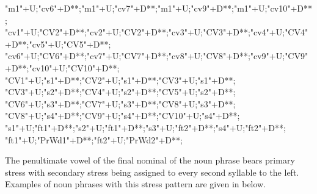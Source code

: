 \begin{multicols}{2}
\begin{exe}
{				"m1"+U;"cv6"+D**\dir{-};"m1"+U;"cv7"+D**\dir{-};"m1"+U;"cv9"+D**\dir{-};"m1"+U;"cv10"+D**\dir{-};
				"cv1"+U;"CV2"+D**\dir{-};"cv2"+U;"CV2"+D**\dir{-};"cv3"+U;"CV3"+D**\dir{-};"cv4"+U;"CV4"+D**\dir{-};"cv5"+U;"CV5"+D**\dir{};
				"cv6"+U;"CV6"+D**\dir{-};"cv7"+U;"CV7"+D**\dir{-};"cv8"+U;"CV8"+D**\dir{};"cv9"+U;"CV9"+D**\dir{-};"cv10"+U;"CV10"+D**\dir{-};
				"CV1"+U;"s1"+D**\dir{-};"CV2"+U;"s1"+D**\dir{-};"CV3"+U;"s1"+D**\dir{-};
				"CV3"+U;"s2"+D**\dir{-};"CV4"+U;"s2"+D**\dir{-};"CV5"+U;"s2"+D**\dir{-};
				"CV6"+U;"s3"+D**\dir{-};"CV7"+U;"s3"+D**\dir{-};"CV8"+U;"s3"+D**\dir{-};
				"CV8"+U;"s4"+D**\dir{-};"CV9"+U;"s4"+D**\dir{-};"CV10"+U;"s4"+D**\dir{-};
				"s1"+U;"ft1"+D**\dir{-};"s2"+U;"ft1"+D**\dir{-};"s3"+U;"ft2"+D**\dir{-};"s4"+U;"ft2"+D**\dir{-};
				"ft1"+U;"PrWd1"+D**\dir{-};"ft2"+U;"PrWd2"+D**\dir{-};
		\endxy}
	\end{exe}
\end{multicols}

The penultimate vowel of the final nominal of 
the noun phrase bears primary stress
with secondary stress being assigned
to every second syllable to the left.
Examples of noun phrases with this stress pattern
are given in  below.

\begin{exe}
\end{exe}

